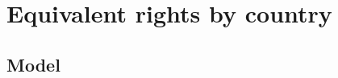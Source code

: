 \documentclass[12pt,english]{article}
\theoremstyle{remark}
\begin{document}

\section{Equivalent rights by country}
\label{sec:by_country}
\label{sec:model}

\subsection{Model}
\end{document}
